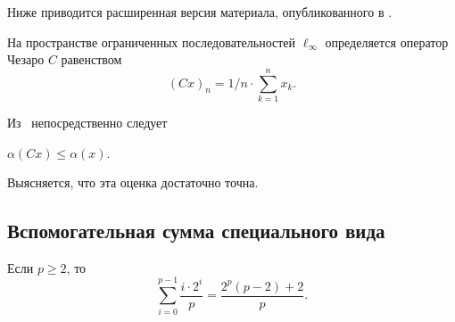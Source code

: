 Ниже приводится расширенная версия материала, опубликованного в
\cite{our-vzms-2018}.

На пространстве ограниченных последовательностей $\ell_\infty$ определяется оператор Чезаро $C$
равенством
\begin{equation}
	(Cx)_n = {1}/{n} \cdot \sum_{k=1}^n x_k
	.
\end{equation}

Из~\cite[Proposition 4]{semenov2020invariant_noncommutative} непосредственно следует
\begin{theorem}
	\label{thm:alpha_Cx_leq_alpha_x}
	$\alpha(Cx) \leqslant \alpha(x)$.
\end{theorem}
Выясняется, что эта оценка достаточно точна.

\subsection{Вспомогательная сумма специального вида}
\begin{lemma}
	Если $p\geq 2$, то
	\begin{equation}\label{summa_drobey}
		\sum_{i=0}^{p-1} \frac{i \cdot 2^i}{p} = \frac{2^p(p-2) + 2}{p}
		.
	\end{equation}
\end{lemma}


